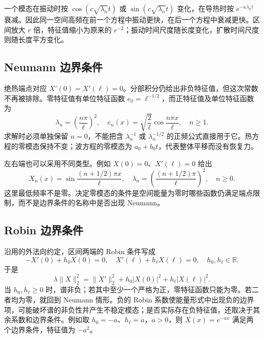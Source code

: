 \ProseParagraphBreak

一个模态在振动时按 \(\cos(c\sqrt{\lambda_n}t)\) 或 \(\sin(c\sqrt{\lambda_n}t)\) 变化，在导热时按 \(e^{-\kappa\lambda_nt}\) 衰减。因此同一空间高频在前一个方程中振动更快，在后一个方程中衰减更快。区间放大 \(r\) 倍，特征值缩小为原来的 \(r^{-2}\)；振动时间尺度随长度变化，扩散时间尺度则随长度平方变化。

\subsection{Neumann 边界条件}
\label{b2:subsec:100103}

绝热端点对应 \(X'(0)=X'(\ell)=0\)。分部积分仍给出非负特征值，但这次常数不再被排除。零特征值有单位特征函数 \(e_0=\ell^{-1/2}\)，而正特征值及单位特征函数为
\begin{equation}\label{b2:eq:10-neumann-modes}
 \lambda_n=\left(\dfrac{n\pi}{\ell}\right)^2,
 \quad e_n(x)=\sqrt{\dfrac2\ell}\cos\dfrac{n\pi x}{\ell},
 \quad n\geq1.
\end{equation}
求解时必须单独保留 \(n=0\)，不能把含 \(\lambda_n^{-1}\) 或 \(\lambda_n^{-1/2}\) 的正频公式直接用于它。热方程的零模态保持不变；波方程的零模态为 \(a_0+b_0t\)，代表整体平移而没有恢复力。

\ProseParagraphBreak

左右端也可以采用不同类型。例如 \(X(0)=0\)、\(X'(\ell)=0\) 给出
\[
 X_n(x)=\sin\dfrac{(n+1/2)\pi x}{\ell},
 \quad\lambda_n=\left(\dfrac{(n+1/2)\pi}{\ell}\right)^2,
 \quad n\geq0.
\]
这里最低频率不是零。决定零模态的条件是空间能量为零时哪些函数仍满足端点限制，而不是边界条件的名称中是否出现 Neumann。

\subsection{Robin 边界条件}
\label{b2:subsec:100104}

沿用的外法向约定，区间两端的 Robin 条件写成
\begin{equation}\label{b2:eq:10-robin-flat}
 -X'(0)+h_0X(0)=0,
 \quad X'(\ell)+h_\ell X(\ell)=0,
 \quad h_0,h_\ell\in\mathbb R.
\end{equation}
于是
\[
 \lambda\|X\|_2^2
 =\|X'\|_2^2+h_0|X(0)|^2+h_\ell|X(\ell)|^2.
\]
当 \(h_0,h_\ell\geq0\) 时，谱非负；若其中至少一个严格为正，零特征函数只能为零。若二者均为零，就回到 Neumann 情形。负的 Robin 系数使能量形式中出现负的边界项，可能破坏谱的非负性并产生不稳定模态；是否实际存在负特征值，还取决于其余系数和边界条件。例如取 \(h_0=-a\)、\(h_\ell=a\)，\(a>0\)，则 \(X(x)=e^{-ax}\) 满足两个边界条件，特征值为 \(-a^2\)。

